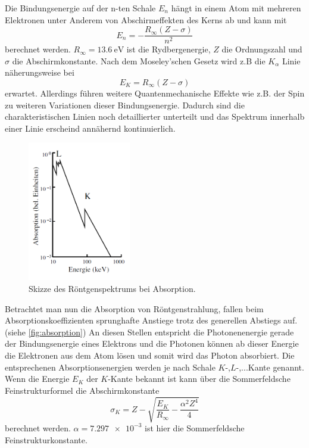 Die Bindungsenergie auf der n-ten Schale $E_n$ hängt in einem Atom mit mehreren Elektronen unter Anderem von Abschirmeffekten des Kerns ab und kann mit
\begin{equation}
    E_n = -\frac{R_\infty(Z-\sigma)}{n^2}
\end{equation}
berechnet werden. 
$R_\infty=\SI{13.6}{\electronvolt}$ ist die Rydbergenergie, $Z$ die Ordnungszahl und $\sigma$ die Abschirmkonstante.\cite{V602}
Nach dem Moseley'schen Gesetz wird z.B die $K_\alpha$ Linie näherungsweise bei
\begin{equation}
    E_K = R_\infty(Z-\sigma)
    \label{eq:moseley}
\end{equation}
erwartet.
Allerdings führen weitere Quantenmechanische Effekte wie z.B. der Spin zu weiteren Variationen dieser Bindungsenergie.
Dadurch sind die charakteristischen Linien noch detaillierter unterteilt und das Spektrum innerhalb einer Linie erscheind annähernd kontinuierlich.

\begin{figure}
    \centering
    \includegraphics[width=0.4\textwidth]{images/absorption.png}
    \caption{Skizze des Röntgenspektrums bei Absorption.\cite{V602}}
    \label{fig:absorption}
\end{figure}

Betrachtet man nun die Absorption von Röntgenstrahlung, fallen beim Absorptionskoeffizienten sprunghafte Anstiege trotz des generellen Abstiegs auf.(siehe \autoref{fig:absorption})
An diesen Stellen entspricht die Photonenenergie gerade der Bindungsenergie eines Elektrons und die Photonen können ab dieser Energie die Elektronen aus dem Atom lösen und somit wird das Photon absorbiert.
Die entsprechenen Absorptionsenergien werden je nach Schale $K$-,$L$-,...Kante genannt.
Wenn die Energie $E_K$ der $K$-Kante bekannt ist kann über die Sommerfeldsche Feinstrukturformel die Abschirmkonstante 
\begin{equation}
    \sigma_K = Z - \sqrt{\frac{E_K}{R_\infty}-\frac{\alpha^2Z^4}{4}}
    \label{eq:abschirm}
\end{equation}
berechnet werden. $\alpha=\num{7.297e-3}$ ist hier die Sommerfeldsche Feinstrukturkonstante.\cite{physics_constants}

